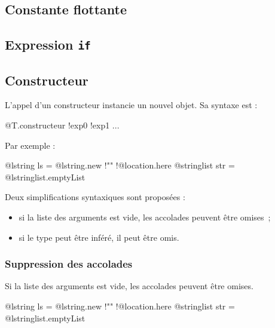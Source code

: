 \subsection{Constante flottante}

\subsection{Expression \texttt{if}}










\subsection{Constructeur}

L'appel d'un constructeur instancie un nouvel objet. Sa syntaxe est :

\begin{galgas4box}
@T.constructeur {!exp0 !exp1 ...}
\end{galgas4box}

Par exemple :
\begin{galgas4}
@lstring ls = @lstring.new {!"" !@location.here{}}
@stringlist str = @lstringlist.emptyList {}
\end{galgas4}

Deux simplifications syntaxiques sont proposées :
\begin{itemize}
  \item si la liste des arguments est vide, les accolades peuvent être omises~;
  \item si le type peut être inféré, il peut être omis.
\end{itemize}


\subsubsection{Suppression des accolades}

Si la liste des arguments est vide, les accolades peuvent être omises.

\begin{galgas4}
@lstring ls = @lstring.new {!"" !@location.here}
@stringlist str = @lstringlist.emptyList
\end{galgas4}




